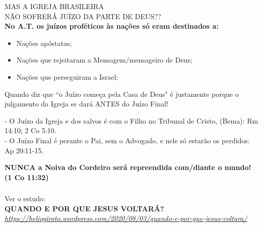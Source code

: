 \documentclass[aspectratio=169]{beamer}
\begin{document}
\begin{frame}

\begin{center}
{\LARGE MAS A IGREJA BRASILEIRA}\\
{\LARGE NÃO SOFRERÁ JUÍZO DA PARTE DE DEUS??}\\
\vspace{.5cm}
\textbf{No A.T. os juízos proféticos às nações só eram destinados a:}
\vspace{.2cm}
\begin{itemize}
  \item Nações apóstatas;
  \item Nações que rejeitaram a Mensagem/mensageiro de Deus;
  \item Nações que perseguiram a Israel;
\end{itemize}
\vspace{.3cm}
Quando diz que ``o Juízo começa pela Casa de Deus" é justamente porque o\\
julgamento da Igreja se dará ANTES do Juízo Final!\\
\end{center}

\begin{small}
- O Juízo da Igreja e dos salvos é com o Filho no Tribunal de Cristo, (Bema): Rm 14:10; 2 Co 5:10.\\
- O Juízo Final é perante o Pai, sem o Advogado, e nele só estarão os perdidos: Ap 20:11-15.\\
\end{small}

\centering
\vspace{.3cm}
\textbf{NUNCA a Noiva do Cordeiro será repreendida com/diante o mundo! (1 Co 11:32)}
\end{frame}

\begin{frame}
\centering
	  \frametitle{}
	  \framesubtitle{}

Ver o estudo:\\
\vspace{1cm}
{\Large \textbf{QUANDO E POR QUE JESUS VOLTARÁ?}}\\
\vspace{.3cm}
\textit{\href{https://heliogiroto.wordpress.com/2020/08/03/quando-e-por-que-jesus-voltara/}{https://heliogiroto.wordpress.com/2020/08/03/quando-e-por-que-jesus-voltara/}}
  
\end{frame}
\end{document}
